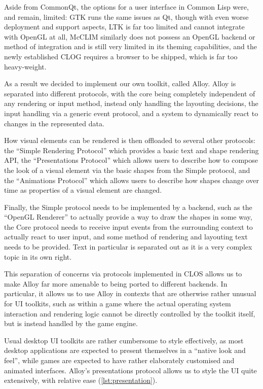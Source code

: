\documentclass[format=sigconf]{acmart}
\begin{document}
Aside from CommonQt, the options for a user interface in Common Lisp were, and remain, limited: GTK runs the same issues as Qt, though with even worse deployment and support aspects, LTK is far too limited and cannot integrate with OpenGL at all, McCLIM similarly does not possess an OpenGL backend or method of integration and is still very limited in its theming capabilities, and the newly established CLOG requires a browser to be shipped, which is far too heavy-weight.

As a result we decided to implement our own toolkit, called Alloy. Alloy is separated into different protocols, with the core being completely independent of any rendering or input method, instead only handling the layouting decisions, the input handling via a generic event protocol, and a system to dynamically react to changes in the represented data.

How visual elements can be rendered is then offloaded to several other protocols: the ``Simple Rendering Protocol'' which provides a basic text and shape rendering API, the ``Presentations Protocol'' which allows users to describe how to compose the look of a visual element via the basic shapes from the Simple protocol, and the ``Animations Protocol'' which allows users to describe how shapes change over time as properties of a visual element are changed.

Finally, the Simple protocol needs to be implemented by a backend, such as the ``OpenGL Renderer'' to actually provide a way to draw the shapes in some way, the Core protocol needs to receive input events from the surrounding context to actually react to user input, and some method of rendering and layouting text needs to be provided. Text in particular is separated out as it is a very complex topic in its own right.

This separation of concerns via protocols implemented in CLOS allows us to make Alloy far more amenable to being ported to different backends. In particular, it allows us to use Alloy in contexts that are otherwise rather unusual for UI toolkits, such as within a game where the actual operating system interaction and rendering logic cannot be directly controlled by the toolkit itself, but is instead handled by the game engine.

Usual desktop UI toolkits are rather cumbersome to style effectively, as most desktop applications are expected to present themselves in a ``native look and feel'', while games are expected to have rather elaborately customised and animated interfaces. Alloy's presentations protocol allows us to style the UI quite extensively, with relative ease (\autoref{lst:presentation}).
\end{document}
